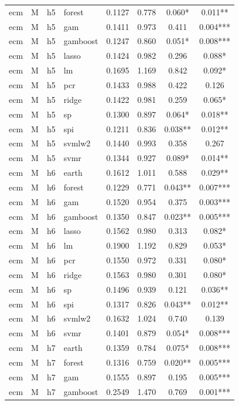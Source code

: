 \begin{ThreePartTable}
\begin{longtable}[t]{llclcccc}
ecm & M & h5 & forest & 0.1127 & 0.778 & 0.060* & 0.011**\\
ecm & M & h5 & gam & 0.1411 & 0.973 & 0.411 & 0.004***\\
ecm & M & h5 & gamboost & 0.1247 & 0.860 & 0.051* & 0.008***\\
ecm & M & h5 & lasso & 0.1424 & 0.982 & 0.296 & 0.088*\\
ecm & M & h5 & lm & 0.1695 & 1.169 & 0.842 & 0.092*\\
ecm & M & h5 & pcr & 0.1433 & 0.988 & 0.422 & 0.126\\
ecm & M & h5 & ridge & 0.1422 & 0.981 & 0.259 & 0.065*\\
ecm & M & h5 & sp & 0.1300 & 0.897 & 0.064* & 0.018**\\
ecm & M & h5 & spi & 0.1211 & 0.836 & 0.038** & 0.012**\\
ecm & M & h5 & svmlw2 & 0.1440 & 0.993 & 0.358 & 0.267\\
ecm & M & h5 & svmr & 0.1344 & 0.927 & 0.089* & 0.014**\\
\addlinespace
ecm & M & h6 & earth & 0.1612 & 1.011 & 0.588 & 0.029**\\
ecm & M & h6 & forest & 0.1229 & 0.771 & 0.043** & 0.007***\\
ecm & M & h6 & gam & 0.1520 & 0.954 & 0.375 & 0.003***\\
ecm & M & h6 & gamboost & 0.1350 & 0.847 & 0.023** & 0.005***\\
ecm & M & h6 & lasso & 0.1562 & 0.980 & 0.313 & 0.082*\\
ecm & M & h6 & lm & 0.1900 & 1.192 & 0.829 & 0.053*\\
ecm & M & h6 & pcr & 0.1550 & 0.972 & 0.331 & 0.080*\\
ecm & M & h6 & ridge & 0.1563 & 0.980 & 0.301 & 0.080*\\
ecm & M & h6 & sp & 0.1496 & 0.939 & 0.121 & 0.036**\\
ecm & M & h6 & spi & 0.1317 & 0.826 & 0.043** & 0.012**\\
ecm & M & h6 & svmlw2 & 0.1632 & 1.024 & 0.740 & 0.139\\
ecm & M & h6 & svmr & 0.1401 & 0.879 & 0.054* & 0.008***\\
\addlinespace
ecm & M & h7 & earth & 0.1359 & 0.784 & 0.075* & 0.008***\\
ecm & M & h7 & forest & 0.1316 & 0.759 & 0.020** & 0.005***\\
ecm & M & h7 & gam & 0.1555 & 0.897 & 0.195 & 0.005***\\
ecm & M & h7 & gamboost & 0.2549 & 1.470 & 0.769 & 0.001***\\

\end{longtable}
\end{ThreePartTable}
